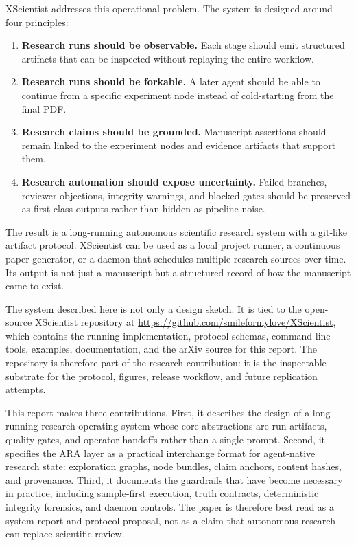\documentclass[11pt]{article}
\begin{document}
XScientist addresses this operational problem. The system is designed around
four principles:

\begin{enumerate}[leftmargin=*]
  \item \textbf{Research runs should be observable.} Each stage should emit
  structured artifacts that can be inspected without replaying the entire
  workflow.
  \item \textbf{Research runs should be forkable.} A later agent should be
  able to continue from a specific experiment node instead of cold-starting
  from the final PDF.
  \item \textbf{Research claims should be grounded.} Manuscript assertions
  should remain linked to the experiment nodes and evidence artifacts that
  support them.
  \item \textbf{Research automation should expose uncertainty.} Failed
  branches, reviewer objections, integrity warnings, and blocked gates should
  be preserved as first-class outputs rather than hidden as pipeline noise.
\end{enumerate}

The result is a long-running autonomous scientific research system with a
git-like artifact protocol. XScientist can be used as a local project runner,
a continuous paper generator, or a daemon that schedules multiple research
sources over time. Its output is not just a manuscript but a structured
record of how the manuscript came to exist.

The system described here is not only a design sketch. It is tied to the
open-source XScientist repository at
\url{https://github.com/smileformylove/XScientist}, which contains the running
implementation, protocol schemas, command-line tools, examples, documentation,
and the arXiv source for this report. The repository is therefore part of the
research contribution: it is the inspectable substrate for the protocol,
figures, release workflow, and future replication attempts.

This report makes three contributions. First, it describes the design of a
long-running research operating system whose core abstractions are run
artifacts, quality gates, and operator handoffs rather than a single prompt.
Second, it specifies the ARA layer as a practical interchange format for
agent-native research state: exploration graphs, node bundles, claim anchors,
content hashes, and provenance. Third, it documents the guardrails that have
become necessary in practice, including sample-first execution, truth
contracts, deterministic integrity forensics, and daemon controls. The paper
is therefore best read as a system report and protocol proposal, not as a
claim that autonomous research can replace scientific review.
\end{document}
